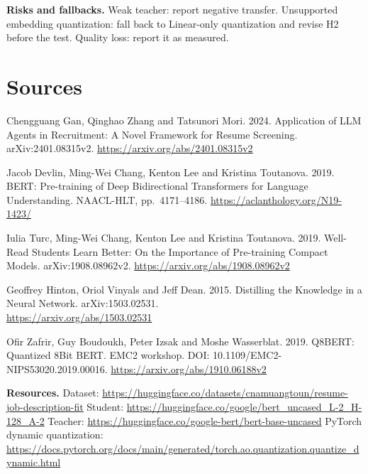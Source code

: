 \documentclass[10pt,a4paper]{article}
\begin{document}
\textbf{Risks and fallbacks.} Weak teacher: report negative transfer. Unsupported embedding quantization: fall back to Linear-only quantization and revise H2 before the test. Quality loss: report it as measured.

\section{Sources}
\begin{enumerate}[leftmargin=1.6em,itemsep=0.2em,label={[\arabic*]}]
\item Chengguang Gan, Qinghao Zhang and Tatsunori Mori. 2024. Application of LLM Agents in Recruitment: A Novel Framework for Resume Screening. arXiv:2401.08315v2. \url{https://arxiv.org/abs/2401.08315v2}
\item Jacob Devlin, Ming-Wei Chang, Kenton Lee and Kristina Toutanova. 2019. BERT: Pre-training of Deep Bidirectional Transformers for Language Understanding. NAACL-HLT, pp.~4171--4186. \url{https://aclanthology.org/N19-1423/}
\item Iulia Turc, Ming-Wei Chang, Kenton Lee and Kristina Toutanova. 2019. Well-Read Students Learn Better: On the Importance of Pre-training Compact Models. arXiv:1908.08962v2. \url{https://arxiv.org/abs/1908.08962v2}
\item Geoffrey Hinton, Oriol Vinyals and Jeff Dean. 2015. Distilling the Knowledge in a Neural Network. arXiv:1503.02531.\\ \url{https://arxiv.org/abs/1503.02531}
\item Ofir Zafrir, Guy Boudoukh, Peter Izsak and Moshe Wasserblat. 2019. Q8BERT: Quantized 8Bit BERT. EMC2 workshop. DOI: 10.1109/EMC2-NIPS53020.2019.00016. \url{https://arxiv.org/abs/1910.06188v2}
\end{enumerate}
\textbf{Resources.} Dataset: \url{https://huggingface.co/datasets/cnamuangtoun/resume-job-description-fit} \textbullet{} Student: \url{https://huggingface.co/google/bert_uncased_L-2_H-128_A-2} \textbullet{} Teacher: \url{https://huggingface.co/google-bert/bert-base-uncased} \textbullet{} PyTorch dynamic quantization: \url{https://docs.pytorch.org/docs/main/generated/torch.ao.quantization.quantize_dynamic.html}
\end{document}
